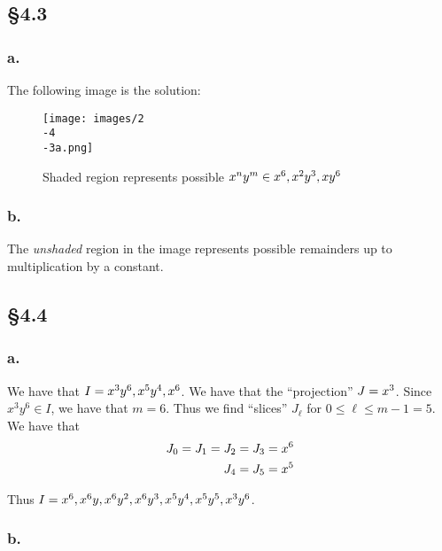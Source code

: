 \documentclass[letterpaper]{article}
\begin{document}
\subsection{\S 4.3}

\subsubsection{a.}

The following image is the solution:

\begin{figure}[H]
  \centering
  \texttt{[image: images/2\\-4\\-3a.png]}
  \caption{Shaded region represents possible $x^{n}y^{m} \in \gen{x^{6}, x^{2}y^{3}, xy^{6}}$}
\end{figure}

\subsubsection{b.}

The \emph{unshaded} region in the image represents possible remainders up to multiplication by a constant. 

\clearpage

\subsection{\S 4.4}

\subsubsection{a.}

We have that $I = \gen{x^{3}y^{6}, x^{5}y^{4}, x^{6}}$. We have that the ``projection'' $J = \gen{x^{3}}$. Since $x^{3}y^{6} \in I$, we have that $m = 6$. Thus we find ``slices'' $J_{\ell}$ for $0 \leq \ell \leq m - 1 = 5$. We have that
\begin{align*}
  J_{0} = J_{1} = J_{2} = J_{3} &= \gen{x^{6}} \\
  J_{4} = J_{5} &= \gen{x^{5}} \\
\end{align*}

Thus $I = \gen{x^{6}, x^{6}y, x^{6}y^{2}, x^{6}y^{3}, x^{5}y^{4}, x^{5}y^{5}, x^{3}y^{6}}$.

\subsubsection{b.}
\end{document}
